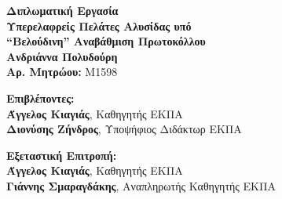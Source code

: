 \begin{center}
    \vspace{3cm}
    \large \textbf{Διπλωματική Εργασία}\\
    \vspace{3cm}
    \textbf{Υπερελαφρείς Πελάτες Αλυσίδας υπό \\
    ``Βελούδινη'' Aναβάθμιση Πρωτοκόλλου}\\
    \vspace{3cm}
    \large \textbf{Ανδριάννα Πολυδούρη}\\
    \textbf{Αρ. Μητρώου:} M1598
 
    \begin{flushleft}
        \textbf{Επιβλέποντες:}\\ 
        \hspace{2cm}
        \textbf{Άγγελος Κιαγιάς}, Καθηγητής ΕΚΠΑ\\
        \hspace{2cm}
        \textbf{Διονύσης Ζήνδρος}, Υποψήφιος Διδάκτωρ ΕΚΠΑ

        \textbf{Εξεταστική Επιτροπή:}\\ 
        \hspace{2cm}
        \textbf{Άγγελος Κιαγιάς}, Καθηγητής ΕΚΠΑ\\
        \hspace{2cm}
        \textbf{Γιάννης Σμαραγδάκης}, Αναπληρωτής Καθηγητής ΕΚΠΑ

    \end{flushleft}
\end{center}


\pagebreak